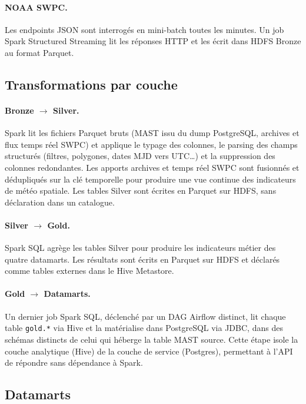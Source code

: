 \documentclass[11pt,a4paper]{article}
\begin{document}
\paragraph{NOAA SWPC.} Les endpoints JSON sont interrogés en mini-batch toutes les minutes. Un job Spark Structured Streaming lit les réponses HTTP et les écrit dans HDFS Bronze au format Parquet.

\subsection{Transformations par couche}

\paragraph{Bronze $\rightarrow$ Silver.} Spark lit les fichiers Parquet bruts (MAST issu du dump PostgreSQL, archives et flux temps réel SWPC) et applique le typage des colonnes, le parsing des champs structurés (filtres, polygones, dates MJD vers UTC\dots) et la suppression des colonnes redondantes. Les apports archives et temps réel SWPC sont fusionnés et dédupliqués sur la clé temporelle pour produire une vue continue des indicateurs de météo spatiale. Les tables Silver sont écrites en Parquet sur HDFS, sans déclaration dans un catalogue.

\paragraph{Silver $\rightarrow$ Gold.} Spark SQL agrège les tables Silver pour produire les indicateurs métier des quatre datamarts. Les résultats sont écrits en Parquet sur HDFS et déclarés comme tables externes dans le Hive Metastore.

\paragraph{Gold $\rightarrow$ Datamarts.} Un dernier job Spark SQL, déclenché par un DAG Airflow distinct, lit chaque table \texttt{gold.*} via Hive et la matérialise dans PostgreSQL via JDBC, dans des schémas distincts de celui qui héberge la table MAST source. Cette étape isole la couche analytique (Hive) de la couche de service (Postgres), permettant à l'API de répondre sans dépendance à Spark.

\subsection{Datamarts}
\end{document}

